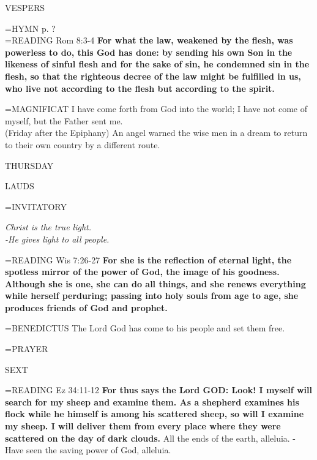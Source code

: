 \begin{flushleft}\normalsize VESPERS\\\end{flushleft}
\hangindent=\parindent \small{\uppercase{HYMN} p.  ?\\}
\hangindent=\parindent \small{READING}    Rom 8:3-4 \textbf{   For what the law, weakened by the flesh, was powerless to do, this God has done: by sending his own Son in the likeness of sinful flesh and for the sake of sin, he condemned sin in the flesh, so that the righteous decree of the law might be fulfilled in us, who live not according to the flesh but according to the spirit.\\}

\hangindent=\parindent \small{MAGNIFICAT 	I have come forth from God into the world; I have not come of myself, but the Father sent me.\\}
(Friday after the Epiphany)
An angel warned the wise men in a dream to return to their own country by a different route.

\begin{center}
\normalsize THURSDAY
\end{center}

\begin{flushleft}\normalsize LAUDS\\\end{flushleft}
\hangindent=\parindent \small{INVITATORY}
\begin{center}
\textit{Christ is the true light.\\}
\textit{-He gives light to all people.\\}
\end{center}

\hangindent=\parindent \small{READING}    Wis 7:26-27 \textbf{   For she is the reflection of eternal light, the spotless mirror of the power of God, the image of his goodness. Although she is one, she can do all things, and she renews everything while herself perduring; passing into holy souls from age to age, she produces friends of God and prophet.\\}

\hangindent=\parindent \small{BENEDICTUS 	The Lord God has come to his people and set them free.\\}

\hangindent=\parindent \small{PRAYER 	}

\begin{flushleft}\normalsize SEXT\\\end{flushleft}
\hangindent=\parindent \small{READING}    Ez 34:11-12 \textbf{   For thus says the Lord GOD: Look! I myself will search for my sheep and examine them. As a shepherd examines his flock while he himself is among his scattered sheep, so will I examine my sheep. I will deliver them from every place where they were scattered on the day of dark clouds.}
All the ends of the earth, alleluia.
-Have seen the saving power of God, alleluia.

